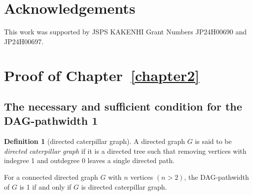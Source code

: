 \documentclass[runningheads]{llncs}
\theoremstyle{plain}
\theoremstyle{definition}
\newtheorem{definition}{Definition}
\begin{document}
\section*{Acknowledgements}

This work was supported by JSPS KAKENHI Grant Numbers JP24H00690 and JP24H00697.













%
%
%
\nocite{*}


%



\appendix
\section{Proof of Chapter~\ref{chapter2}}

\subsection{The necessary and sufficient condition for the DAG-pathwidth 1}\label{appendix_A1}

\begin{definition}[directed caterpillar graph]
    A directed graph $G$ is said to be \textit{directed caterpillar graph} if it is a directed tree such that removing vertices with indegree 1 and outdegree 0 leaves a single directed path.
\end{definition}

\begin{lemma} \label{caterpillar}
    For a connected directed graph $G$ with $n$ vertices $(n > 2)$, the DAG-pathwidth of $G$ is 1 if and only if $G$ is directed caterpillar graph.
\end{lemma}
\end{document}
